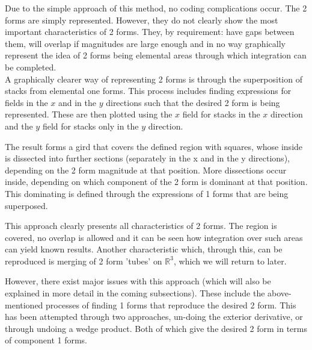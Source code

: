 \documentclass[11]{report}
\begin{document}
\noindent Due to the simple approach of this method, no coding complications occur. The 2 forms are simply represented. However, they do not clearly show the most important characteristics of 2 forms. They, by requirement: have gaps between them, will overlap if magnitudes are large enough and in no way graphically represent the idea of 2 forms being elemental areas through which integration can be completed.\\

A graphically clearer way of representing 2 forms is through the superposition of stacks from elemental one forms. This process includes finding expressions for fields in the $x$ and in the $y$ directions such that the desired 2 form is being represented. These are then plotted using the $x$ field for stacks in the $x$ direction and the $y$ field for stacks only in the $y$ direction.

\noindent The result forms a gird that covers the defined region with squares, whose inside is dissected into further sections (separately in the x and in the y directions), depending on the 2 form magnitude at that position. More dissections occur inside, depending on which component of the 2 form is dominant at that position. This dominating is defined through the expressions of 1 forms that are being superposed.

This approach clearly presents all characteristics of 2 forms. The region is covered, no overlap is allowed and it can be seen how integration over such areas can yield known results. Another characteristic which, through this, can be reproduced is merging of 2 form 'tubes' on $\mathbb{R}^{3}$, which we will return to later.

However, there exist major issues with this approach (which will also be explained in more detail in the coming subsections). These include the above-mentioned processes of finding 1 forms that reproduce the desired 2 form. This has been attempted through two approaches, un-doing the exterior derivative, or through undoing a wedge product. Both of which give the desired 2 form in terms of component 1 forms.
\end{document}
